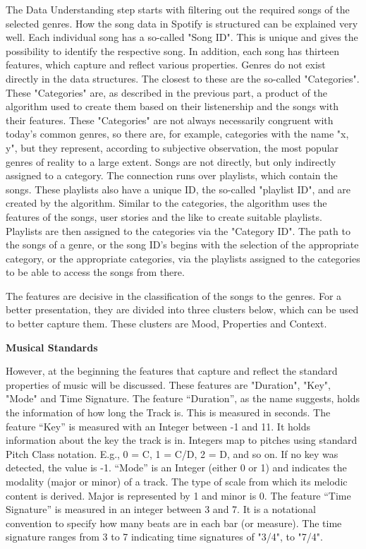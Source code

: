 The Data Understanding step starts with filtering out the required songs of the selected genres. 
How the song data in Spotify is structured can be explained very well.
Each individual song has a so-called "Song ID". 
This is unique and gives the possibility to identify the respective song.
In addition, each song has thirteen features, which capture and reflect various properties. 
Genres do not exist directly in the data structures. The closest to these are the so-called "Categories". 
These "Categories" are, as described in the previous part, a product of the algorithm used
to create them based on their listenership and the songs with their features. 
These "Categories" are not always necessarily congruent with today's common genres,
so there are, for example, categories with the name "x, y", but they represent, 
according to subjective observation, the most popular genres of reality to a large extent.
Songs are not directly, but only indirectly assigned to a category. 
The connection runs over playlists, which contain the songs.
These playlists also have a unique ID, the so-called "playlist ID", and are created by the algorithm. 
Similar to the categories, the algorithm uses the features of the songs,
user stories and the like to create suitable playlists. 
Playlists are then assigned to the categories via the "Category ID".
The path to the songs of a genre, or the song ID's begins with the selection of the appropriate category,
or the appropriate categories, via the playlists assigned to the categories
to be able to access the songs from there.

The features are decisive in the classification of the songs to the genres.
For a better presentation, they are divided into three clusters below, 
which can be used to better capture them. These clusters are Mood, Properties and Context.

\textbf{Musical Standards}

However, at the beginning the features that capture and reflect the standard properties of music will
be discussed. These features are "Duration", "Key", "Mode" and Time Signature. 
The feature “Duration”, as the name suggests, holds the information of how long the Track is.
This is measured in seconds. The feature “Key” is measured with an Integer between -1 and 11.
It holds information about the key the track is in. Integers map to pitches using
standard Pitch Class notation. 
E.g., 0 = C, 1 = C\sharp/D\flat, 2 = D, and so on. If no key was detected, the value is -1. %
“Mode” is an Integer (either 0 or 1) and indicates the modality (major or minor) of a track. 
The type of scale from which its melodic content is derived. Major is represented by 1 and minor is 0. 
The feature “Time Signature” is measured in an integer between 3 and 7.
It is a notational convention to specify how many beats are in each bar (or measure). 
The time signature ranges from 3 to 7 indicating time signatures of "3/4", to "7/4".

